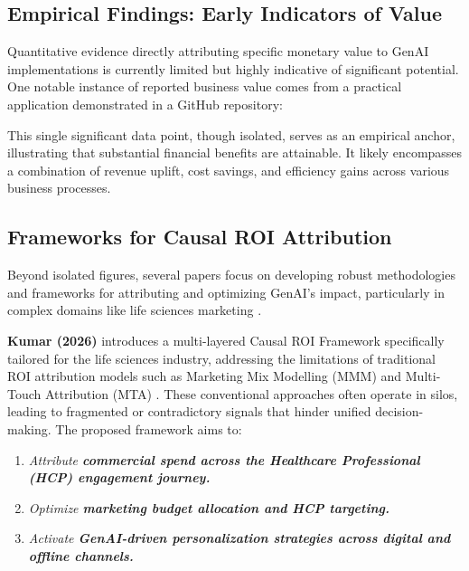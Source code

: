 \documentclass[10pt,twocolumn,letterpaper]{article}
\begin{document}
\subsection{Empirical Findings: Early Indicators of Value}


Quantitative evidence directly attributing specific monetary value to GenAI implementations is currently limited but highly indicative of significant potential. One notable instance of reported business value comes from a practical application demonstrated in a GitHub repository:

This single significant data point, though isolated, serves as an empirical anchor, illustrating that substantial financial benefits are attainable. It likely encompasses a combination of revenue uplift, cost savings, and efficiency gains across various business processes.


\subsection{Frameworks for Causal ROI Attribution}


Beyond isolated figures, several papers focus on developing robust methodologies and frameworks for attributing and optimizing GenAI's impact, particularly in complex domains like life sciences marketing \cite{crossref_10_2139_ssrn_6374778,crossref_10_2139_ssrn_5629770,crossref_10_52710_cfs_1082}.

\textbf{Kumar (2026)} introduces a multi-layered Causal ROI Framework specifically tailored for the life sciences industry, addressing the limitations of traditional ROI attribution models such as Marketing Mix Modelling (MMM) and Multi-Touch Attribution (MTA) \cite{crossref_10_2139_ssrn_6374778}. These conventional approaches often operate in silos, leading to fragmented or contradictory signals that hinder unified decision-making. The proposed framework aims to:
\begin{enumerate}
  \item \textit{Attribute\textbf{ commercial spend across the Healthcare Professional (HCP) engagement journey.}}
  \item \textit{Optimize\textbf{ marketing budget allocation and HCP targeting.}}
  \item \textit{Activate\textbf{ GenAI-driven personalization strategies across digital and offline channels.}}
\end{enumerate}
\end{document}
